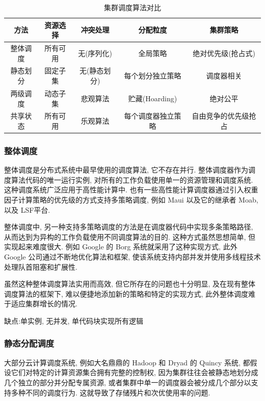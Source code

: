 \documentclass[UTF8,a4paper]{ctexart}
\begin{document}
\begin{table}[!hbp]
    \centering
    \begin{tabular}{c|c|c|c|c}
    方法& 资源选择& 冲突处理& 分配粒度& 集群策略 \\
    \hline
    整体调度& 所有可用& 无(序列化)& 全局策略& 绝对优先级(抢占式) \\
    静态划分& 固定子集& 无(静态划分)& 每个划分独立策略& 调度器相关 \\
    两级调度& 动态子集& 悲观算法& 贮藏(Hoarding)& 绝对公平 \\
    共享状态& 所有可用& 乐观算法& 每个调度器独立策略& 自由竞争的优先级抢占 \\
    \end{tabular}
    \caption{集群调度算法对比}
    \label{schedulers_comparison}
\end{table}

\subsubsection{整体调度}
整体调度是分布式系统中最早使用的调度算法, 它不存在并行. 整体调度器作为调度算法代码的唯一运行实例, 对所有的工作负载使用单一的资源管理和调度系统. 这种调度系统广泛应用于高性能计算中. 也有一些高性能计算调度器通过引入权重因子计算策略的优先级的方式支持多策略调度, 例如 Maui\cite{Maui2001} 以及它的继承者 Moab, 以及 LSF平台\cite{Iqbal2005}.

整体调度中, 另一种支持多策略调度的方法是在调度器代码中实现多条策略路径, 从而达到为异构的工作负载使用不同调度算法的目的. 这种方式虽然思想简单, 但实现起来难度很大. 例如 Google 的 Borg 系统就采用了这种实现方式, 此外 Google 公司通过不断地优化算法和框架, 使该系统支持内部并发并使用多线程技术处理队首阻塞和扩展性.

虽然这种整体调度算法实用而高效, 但它所存在的问题也十分明显, 及在现有整体调度算法的框架下, 难以便捷地添加新的策略和特定的实现方式\cite{Omega2013}, 此外整体调度难于适应集群增长的情况.

缺点:单实例, 无并发, 单代码块实现所有逻辑

\subsubsection{静态分配调度}
大部分云计算调度系统, 例如大名鼎鼎的 Hadoop\cite{Hadoop2010} 和 Dryad 的 Quincy\cite{Quincy2009} 系统, 都假设它们对特定的计算资源集合拥有完整的控制权, 因为集群往往会被静态地划分成几个独立的部分并分配专属资源, 或者集群中单一的调度器会被分成几个部分以支持多种不同的调度行为\cite{Yanpei2012}. 这就导致了存储残片和次优使用率的问题.
\end{document}
